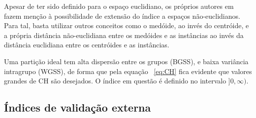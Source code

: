 Apesar de ter sido definido para o espaço euclidiano, os próprios autores em \parencite{CH} fazem menção à possibilidade de extensão do índice a espaços não-euclidianos. Para tal, basta utilizar outros conceitos como o medóide, ao invés do centróide, e a própria distância não-euclidiana entre os medóides e as instâncias ao invés da distância euclidiana entre os centróides e as instâncias.

Uma partição ideal tem alta dispersão entre os grupos (BGSS), e baixa variância intragrupo (WGSS), de forma que pela equação ~\ref{eq:CH} fica evidente que valores grandes de CH são desejados. O índice em questão é definido no intervalo $]0,\infty)$.








\subsection{Índices de validação externa}

